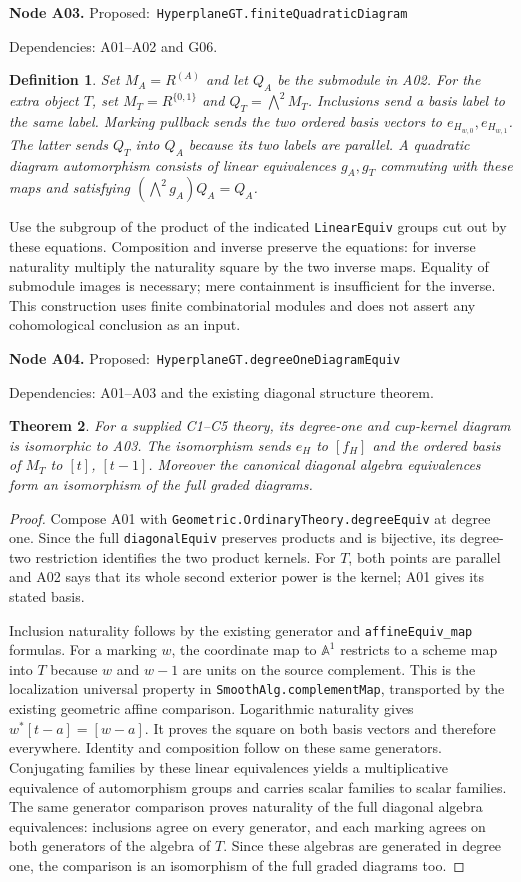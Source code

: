 \documentclass[11pt]{article}
\newtheorem{theorem}{Theorem}[section]
\newtheorem{definition}[theorem]{Definition}
\theoremstyle{remark}\newtheorem{remark}[theorem]{Remark}
\newcommand{\A}{\mathbb A}
\newcommand{\code}[1]{\nolinkurl{#1}}
\newcommand{\node}[3]{\par\Needspace{8\baselineskip}\smallskip\noindent\textbf{Node #1.}\quad
 \textsf{Proposed:}\ \code{#2}\par\noindent
 \textsf{Dependencies:} #3.\par\smallskip}
\begin{document}
\node{A03}{HyperplaneGT.finiteQuadraticDiagram}{A01--A02 and G06}
\begin{definition}\label{def:a03}
Set $M_A=R^{(A)}$ and let $Q_A$ be the submodule in A02. For the
extra object $T$, set $M_T=R^{\{0,1\}}$ and $Q_T=\bigwedge^2M_T$.
Inclusions send a basis label to the same label. Marking pullback
sends the two ordered basis vectors to $e_{H_{w,0}},e_{H_{w,1}}$.
The latter sends $Q_T$ into $Q_A$ because its two labels are parallel.
A quadratic diagram automorphism consists of linear equivalences
$g_A,g_T$ commuting with these maps and satisfying
$(\bigwedge^2g_A)Q_A=Q_A$.
\end{definition}
Use the subgroup of the product of the indicated \code{LinearEquiv}
groups cut out by these equations. Composition and inverse
preserve the equations: for inverse naturality multiply the
naturality square by the two inverse maps. Equality of submodule
images is necessary; mere containment is insufficient for the
inverse. This construction uses finite combinatorial modules and
does not assert any cohomological conclusion as an input.

\node{A04}{HyperplaneGT.degreeOneDiagramEquiv}{A01--A03 and the existing diagonal structure theorem}
\begin{theorem}\label{thm:a04}
For a supplied C1--C5 theory, its degree-one and cup-kernel diagram
is isomorphic to A03. The isomorphism sends $e_H$ to $[f_H]$ and
the ordered basis of $M_T$ to $[t]$, $[t-1]$.
Moreover the canonical diagonal algebra equivalences form an
isomorphism of the full graded diagrams.
\end{theorem}
\begin{proof}
Compose A01 with
\code{Geometric.OrdinaryTheory.degreeEquiv} at degree one. Since the full
\code{diagonalEquiv} preserves products and is bijective, its
degree-two restriction identifies the two product kernels. For
$T$, both points are parallel and A02 says that its whole second
exterior power is the kernel; A01 gives its stated basis.

Inclusion naturality follows by the existing generator and
\code{affineEquiv_map} formulas. For a marking $w$, the coordinate
map to $\A^1$ restricts to a scheme map into $T$ because $w$ and
$w-1$ are units on the source complement. This is the localization
universal property in \code{SmoothAlg.complementMap}, transported
by the existing geometric affine comparison. Logarithmic naturality
gives $w^*[t-a]=[w-a]$. It proves the square on both basis vectors
and therefore everywhere. Identity and composition follow on
these same generators. Conjugating families by these linear
equivalences yields a multiplicative equivalence of automorphism
groups and carries scalar families to scalar families.
The same generator comparison proves naturality of the full
diagonal algebra equivalences: inclusions agree on every
generator, and each marking agrees on both generators of the
algebra of $T$. Since these algebras are generated in degree one,
the comparison is an isomorphism of the full graded diagrams too.
\end{proof}
\end{document}
